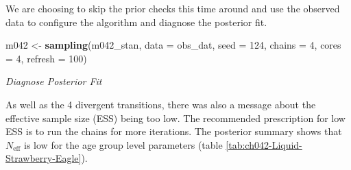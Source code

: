 \documentclass[11pt, oneside, openany]{scrbook}
\newenvironment{Shaded}{\begin{snugshade}}{\end{snugshade}}
\newcommand{\CommentTok}[1]{\textcolor[rgb]{0.56,0.35,0.01}{\textit{#1}}}
\newcommand{\DataTypeTok}[1]{\textcolor[rgb]{0.13,0.29,0.53}{#1}}
\newcommand{\DecValTok}[1]{\textcolor[rgb]{0.00,0.00,0.81}{#1}}
\newcommand{\KeywordTok}[1]{\textcolor[rgb]{0.13,0.29,0.53}{\textbf{#1}}}
\newcommand{\NormalTok}[1]{#1}
\newcommand{\StringTok}[1]{\textcolor[rgb]{0.31,0.60,0.02}{#1}}
\begin{document}
We are choosing to skip the prior checks this time around and use the observed data to configure the algorithm and diagnose the posterior fit.

\begin{Shaded}
\begin{Highlighting}[]
\NormalTok{m042 <-}\StringTok{ }\KeywordTok{sampling}\NormalTok{(m042_stan, }\DataTypeTok{data =}\NormalTok{ obs_dat, }\DataTypeTok{seed =} \DecValTok{124}\NormalTok{,}
                 \DataTypeTok{chains =} \DecValTok{4}\NormalTok{, }\DataTypeTok{cores =} \DecValTok{4}\NormalTok{, }\DataTypeTok{refresh =} \DecValTok{100}\NormalTok{)}
\end{Highlighting}
\end{Shaded}

\emph{Diagnose Posterior Fit}

\begin{Shaded}
\end{Shaded}

As well as the 4 divergent transitions, there was also a message about the effective sample size (ESS) being too low. The recommended prescription for low ESS is to run the chains for more iterations. The posterior summary shows that \(N_{\mathrm{eff}}\) is low for the age group level parameters (table \ref{tab:ch042-Liquid-Strawberry-Eagle}).
\end{document}
